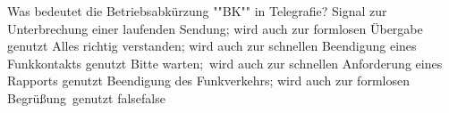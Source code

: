     {Was bedeutet die Betriebsabkürzung ""BK"" in Telegrafie?}
    {Signal zur Unterbrechung einer laufenden Sendung; wird auch zur formlosen Übergabe genutzt}
    {Alles richtig verstanden; wird auch zur schnellen Beendigung eines Funkkontakts genutzt}
    {Bitte warten; wird auch zur schnellen Anforderung eines Rapports genutzt}
    {Beendigung des Funkverkehrs; wird auch zur formlosen Begrüßung genutzt}
    {false}{false}